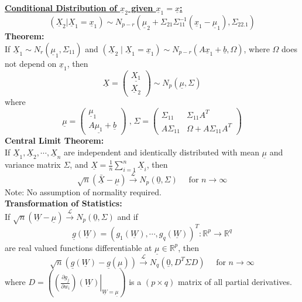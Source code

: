 \documentclass[a4paper]{article}
\begin{document}
\begin{multicols*}{4}
\underline{\textbf{Conditional Distribution of $\underline{x}_2$ given $\underline{x}_1 = \underline{x}$:}} \\
$$\left(\underline{X}_2 | \underline{X}_1=\underline{x}_1\right) \sim N_{p-r}\left(\underline{\mu}_2+\Sigma_{21} \Sigma_{11}^{-1}\left(\underline{x}_1-\underline{\mu}_1\right), \Sigma_{22.1}\right)$$
\textbf{Theorem:} \\
If $\underline{X}_1 \sim N_r\left(\underline{\mu}_1, \Sigma_{11}\right)$ and $\left(\underline{X}_2 \mid \underline{X}_1=\underline{x}_1\right) \sim N_{p-r}\left(A \underline{x}_1+\underline{b}, \Omega\right)$, where $\Omega$ does not depend on $\underline{x}_1$, then
$$
\underline{X}=\left(\begin{array}{l}
\underline{X_1} \\
\underline{X}_2
\end{array}\right) \sim N_p(\underline{\mu}, \Sigma)
$$
where 
$$
\underline{\mu}=\left(\begin{array}{c}\underline{\mu}_1 \\ A \underline{\mu_1}+\underline{b}\end{array}\right) 
\; \text{,} \;
\Sigma=\left(\begin{array}{cc}\Sigma_{11} & \Sigma_{11} A^T \\ A \Sigma_{11} & \Omega+A \Sigma_{11} A^T\end{array}\right)
$$
\smallskip
\hline
\smallskip
\textbf{Central Limit Theorem:} \\
If $\underline{X}_1, \underline{X}_2, \cdots, \underline{X}_n$ are independent and identically distributed with mean $\underline{\mu}$ and variance matrix $\Sigma$, and $\underline{X}=\frac{1}{n} \sum_{i=1}^n \underline{X}_i$, then
$$
\sqrt{n}(\underline{\bar{X}}-\underline{\mu}) \stackrel{\mathcal{L}}{\rightarrow} N_p(\underline{0}, \Sigma) \quad \text { for } n \rightarrow \infty
$$
Note: No assumption of normality required. \\
\textbf{Transformation of Statistics:} \\
\smallskip
If $\sqrt{n}(\underline{W}-\underline{\mu}) \stackrel{\mathcal{L}}{\rightarrow} N_p(\underline{0}, \Sigma)$ and
if $$\underline{g}(\underline{W})=\left(g_1(\underline{W}), \cdots, g_q(\underline{W})\right)^T: \mathbb{R}^p \rightarrow \mathbb{R}^q$$ are real valued functions differentiable at $\underline{\mu} \in \mathbb{R}^p$, then
$$
\sqrt{n}(\underline{g}(\underline{W})-\underline{g}(\underline{\mu})) \stackrel{\mathcal{L}}{\rightarrow} N_q\left(\underline{0}, D^T \Sigma D\right) \quad \text { for } n \rightarrow \infty
$$
where $D=\left(\left.\left(\frac{\partial g_j}{\partial w_i}\right)(\underline{W})\right|_{\underline{W}=\underline{\mu}}\right)$ is a $(p \times q)$ matrix of all partial derivatives.


\end{multicols*}
\end{document}

